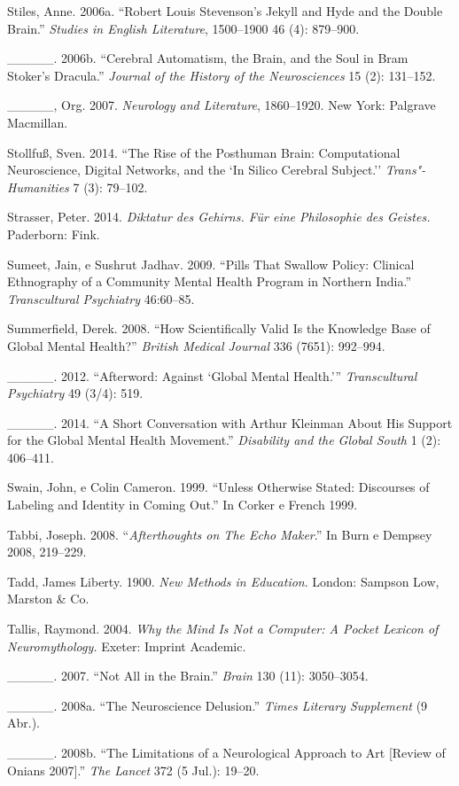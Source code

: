 {\begin{Parskip}
Stiles, Anne. 2006a. ``Robert Louis Stevenson's Jekyll and Hyde and the
Double Brain.'' \emph{Studies in English Literature}, 1500--1900 46 (4):
879--900.

\_\_\_\_\_. 2006b. ``Cerebral Automatism, the Brain, and the Soul in Bram
Stoker's Dracula.'' \emph{Journal of the History of the Neurosciences}
15 (2): 131--152.

\_\_\_\_\_, Org. 2007. \emph{Neurology and Literature}, 1860--1920. New
York: Palgrave Macmillan.

Stollfuß, Sven. 2014. ``The Rise of the Posthuman Brain: Computational
Neuroscience, Digital Networks, and the `In Silico Cerebral Subject.''
\emph{Trans"-Humanities} 7 (3): 79--102.

Strasser, Peter. 2014. \emph{Diktatur des Gehirns. Für eine Philosophie
des Geistes.} Paderborn: Fink.

Sumeet, Jain, e Sushrut Jadhav. 2009. ``Pills That Swallow Policy:
Clinical Ethnography of a Community Mental Health Program in Northern
India.'' \emph{Transcultural Psychiatry} 46:60--85.

Summerfield, Derek. 2008. ``How Scientifically Valid Is the Knowledge
Base of Global Mental Health?'' \emph{British Medical Journal} 336
(7651): 992--994.

\_\_\_\_\_. 2012. ``Afterword: Against `Global Mental Health.'''
\emph{Transcultural Psychiatry} 49 (3/4): 519.

\_\_\_\_\_. 2014. ``A Short Conversation with Arthur Kleinman About His
Support for the Global Mental Health Movement.'' \emph{Disability and
the Global South} 1 (2): 406--411.

Swain, John, e Colin Cameron. 1999. ``Unless Otherwise Stated:
Discourses of Labeling and Identity in Coming Out.'' In Corker e French
1999.

Tabbi, Joseph. 2008. ``\emph{Afterthoughts on The Echo Maker}.'' In Burn
e Dempsey 2008, 219--229.

Tadd, James Liberty. 1900. \emph{New Methods in Education}. London:
Sampson Low, Marston \& Co.

Tallis, Raymond. 2004. \emph{Why the Mind Is Not a Computer: A Pocket
Lexicon of Neuromythology.} Exeter: Imprint Academic.

\_\_\_\_\_. 2007. ``Not All in the Brain.'' \emph{Brain} 130 (11):
3050--3054.

\_\_\_\_\_. 2008a. ``The Neuroscience Delusion.'' \emph{Times Literary
Supplement} (9 Abr.).

\_\_\_\_\_. 2008b. ``The Limitations of a Neurological Approach to Art
{[}Review of Onians 2007{]}.'' \emph{The Lancet} 372 (5 Jul.): 19--20.


\end{Parskip}}
